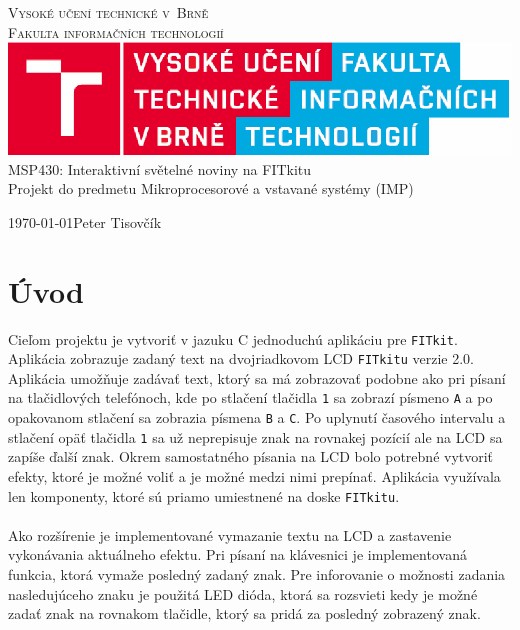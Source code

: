 \documentclass[10pt,a4paper,final]{article}
\begin{document}
\thispagestyle{empty}

\begin{center}
	\Huge \textsc{Vysoké učení technické v~Brně}\\
	\huge \textsc{Fakulta informačních technologií}\\
	\includegraphics[keepaspectratio]{images/fit.eps}\\
	\Huge MSP430: Interaktivní světelné noviny na FITkitu\\[5mm]
	\Large Projekt do predmetu Mikroprocesorové a vstavané systémy (IMP)\\
\end{center}
{\large \today \hfill Peter Tisovčík}
\newpage

\pagestyle{plain}
\setcounter{page}{1}

\tableofcontents
\newpage

\section{Úvod} \label{sec:uvod}

\noindent Cieľom projektu je vytvoriť v jazuku C jednoduchú aplikáciu pre \texttt{FITkit}. Aplikácia zobrazuje zadaný text na dvojriadkovom LCD \texttt{FITkitu} verzie 2.0. Aplikácia umožňuje zadávať text, ktorý sa má zobrazovať podobne ako pri písaní na tlačidlových telefónoch, kde po stlačení tlačidla \texttt{1} sa zobrazí písmeno \texttt{A} a po opakovanom stlačení sa zobrazia písmena \texttt{B} a \texttt{C}. Po uplynutí časového intervalu a stlačení opäť tlačidla \texttt{1} sa už neprepisuje znak na rovnakej pozícií ale na LCD sa zapíše ďalší znak. Okrem samostatného písania na LCD bolo potrebné vytvoriť efekty, ktoré je možné voliť a je možné medzi nimi prepínať. Aplikácia využívala len komponenty, ktoré sú priamo umiestnené na doske \texttt{FITkitu}. 
\\\\
Ako rozšírenie je implementované vymazanie textu na LCD a zastavenie vykonávania aktuálneho efektu. Pri písaní na klávesnici je implementovaná funkcia, ktorá vymaže posledný zadaný znak. Pre inforovanie o možnosti zadania nasledujúceho znaku je použitá LED dióda, ktorá sa rozsvieti kedy je možné zadať znak na rovnakom tlačidle, ktorý sa pridá za posledný zobrazený znak.
\end{document}

